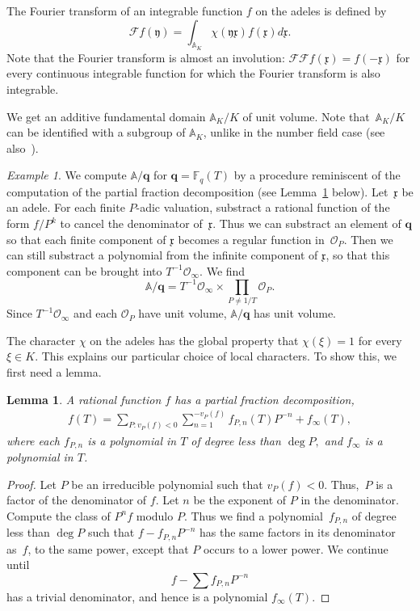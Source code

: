 \documentclass{amsart}
\newcommand\F{\mathbb{F}}
\newcommand\q{\mathbf{q}}
\newcommand\oo{\mathcal{O}}
\newcommand\Fo{\mathcal{F}}
\newcommand\A{\mathbb{A}}
\newcommand\x{\mathfrak{x}}	\newcommand\y{\mathfrak{y}}
\newtheorem{lemma}[theorem]{Lemma}
\theoremstyle{definition}\newtheorem{definition}[theorem]{Definition}
\theoremstyle{remark}\newtheorem{remark}[theorem]{Remark}
\newtheorem{example}[theorem]{Example}\newtheorem{exercise}[theorem]{Exercise}
\numberwithin{equation}{section}
\begin{document}
The Fourier transform of an integrable function $f$ on the adeles is defined by
$$
\Fo f(\y)=\int_{\A_K}\chi(\y\x)f(\x)d\x.
$$
Note that the Fourier transform is almost an involution:
$\Fo\Fo f(\x)=f(-\x)$ for every continuous integrable function for which the Fourier transform is also integrable.\medskip

We get an additive fundamental domain $\A_K/K$ of unit volume.
Note that~$\A_K/K$ can be identified with a subgroup of $\A_K$,
unlike in the number field case (see also~\cite[Lemma~4.1.4]{Tate}).

\begin{example}
We compute $\A/\q$ for $\q=\F_q(T)$ by a procedure reminiscent of the computation of the partial fraction decomposition (see Lemma~\ref{L: partial fractions} below).
Let~$\x$ be an adele.
For each finite $P$-adic valuation,
substract a rational function of the form $f/P^k$ to cancel the denominator of~$\x$.
Thus we can substract an element of $\q$ so that each finite component of $\x$ becomes a regular function in~$\oo_P$.
Then we can still substract a polynomial from the infinite component of $\x$,
so that this component can be brought into $T^{-1}\oo_\infty$.
We find
$$
\A/\q=T^{-1}\oo_{\infty}\times\prod_{P\neq1/T}\oo_P.
$$
Since $T^{-1}\oo_{\infty}$ and each $\oo_P$ have unit volume,
$\A/\q$ has unit volume.
\end{example}

The character $\chi$ on the adeles has the global property that $\chi(\xi)=1$ for every $\xi\in K$.
This explains our particular choice of local characters.
To show this,
we first need a lemma.

\begin{lemma}\label{L: partial fractions}
A rational function\/ $f$ has a partial fraction decomposition,
\begin{gather}\label{E: partial fractions}
f(T)=\sum_{P\colon v_P(f)<0}\sum_{n=1}^{-v_P(f)}f_{P,n}(T)P^{-n}+f_{\infty}(T),
\end{gather}
where each\/ $f_{P,n}$ is a polynomial in\/ $T$ of degree less than\/ $\deg P,$
 and\/ $f_{\infty}$ is a polynomial in\/ $T$.
\end{lemma}

\begin{proof}
Let $P$ be an irreducible polynomial such that $v_P(f)<0$.
Thus,~$P$ is a factor of the denominator of $f$.
Let $n$ be the exponent of $P$ in the denominator.
Compute the class of $P^nf$ modulo $P$.
Thus we find a polynomial~$f_{P,n}$ of degree less than $\deg P$ such that $f-f_{P,n}P^{-n}$ has the same factors in its
denominator as~$f$,
to the same power,
except that $P$ occurs to a lower power.
We continue until
$$
f-\sum f_{P,n}P^{-n}
$$
 has a trivial denominator,
and hence is a polynomial $f_\infty(T)$.
\end{proof}
\end{document}
